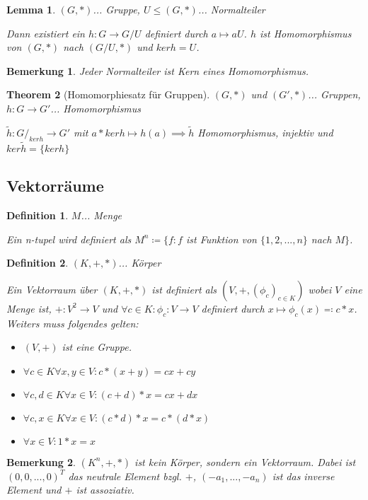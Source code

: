\documentclass[twocolumn]{article}
\newtheorem{theorem}{Theorem}[section]
\newtheorem{lemma}[theorem]{Lemma}
\newtheorem{definition}{Definition}[section]
\newtheorem*{remark}{Bemerkung}
\begin{document}
\begin{lemma}
	$(G,*)$... Gruppe, $U\leq(G,*)$... Normalteiler
	
	Dann existiert ein $h:G\rightarrow G/U$ definiert durch $a \mapsto aU$. $h$ ist Homomorphismus von $(G,*)$ nach $(G/U,*)$ und $kerh=U$.
\end{lemma}

\begin{remark}
	Jeder Normalteiler ist Kern eines Homomorphismus.
\end{remark}

\begin{theorem}[Homomorphiesatz für Gruppen]
	$(G,*)$ und $(G',*)$... Gruppen, $h:G\rightarrow G'$... Homomorphismus
	
	$\tilde{h}:G/_{kerh}\rightarrow G'$ mit $a*kerh\mapsto h(a) \implies \tilde{h}$ Homomorphismus, injektiv und $ker\tilde{h}=\{kerh\}$
\end{theorem}

\subsection{Vektorräume}
\begin{definition}
	$M$... Menge
	
	Ein n-tupel wird definiert als $M^{n}\coloneqq \{f : f$ ist Funktion von $\{1,2,...,n\}$ nach $M\}$.
\end{definition}

\begin{definition}
	$(K,+,*)$... Körper
	
	Ein Vektorraum über $(K,+,*)$ ist definiert als $(V,+,(\phi_{c})_{c \in K})$ wobei $V$ eine Menge ist, $+:V^{2}\rightarrow V$ und $\forall c \in K : \phi_{c}:V\rightarrow V$ definiert durch $x \mapsto \phi_{c}(x) \eqqcolon c*x$. Weiters muss folgendes gelten:
	
	\begin{itemize}
		\item $(V,+)$ ist eine Gruppe.
		\item $\forall c \in K \forall x,y \in V: c*(x+y)=cx+cy$
		\item $\forall c,d \in K \forall x \in V: (c+d)*x = cx+dx$
		\item $\forall c,x \in K \forall x \in V: (c*d)*x=c*(d*x)$
		\item $\forall x \in V : 1*x=x$
	\end{itemize}
\end{definition}

\begin{remark}
	$(K^{n},+,*)$ ist kein Körper, sondern ein Vektorraum. Dabei ist $(0,0,...,0)^{T}$ das neutrale Element bzgl. $+$, $(-a_{1},...,-a_{n})$ ist das inverse Element und $+$ ist assoziativ.
\end{remark}
\end{document}
